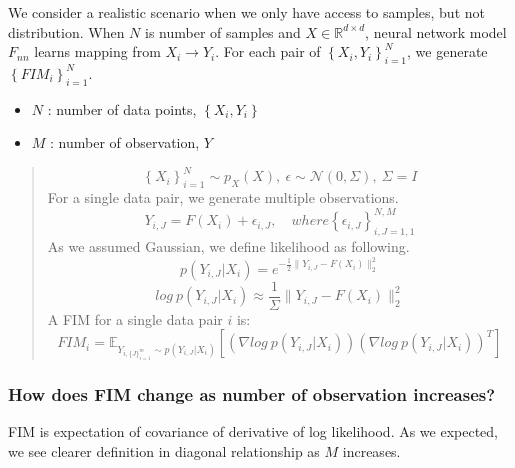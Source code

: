 \documentclass[
]{article}
\providecommand{\tightlist}{%
  \setlength{\itemsep}{0pt}\setlength{\parskip}{0pt}}\usepackage{longtable,booktabs,array}
\begin{document}
We consider a realistic scenario when we only have access to samples,
but not distribution. When \(N\) is number of samples and
\(X \in \mathbb{R}^{d \times d}\), neural network model \(F_{nn}\)
learns mapping from \(X_i \rightarrow Y_i\). For each pair of
\(\left\{X_i, Y_i \right\}^N_{i=1}\), we generate
\(\left\{FIM_i\right\}_{i=1}^{N}\).

\begin{itemize}
\tightlist
\item
  \(N\) : number of data points, \(\left\{X_i, Y_i \right\}\)
\item
  \(M\) : number of observation, \(Y\)
\end{itemize}

\begin{quote}
\[ \left\{ X_i \right\}^N_{i=1} \sim p_X(X), \: \epsilon \sim \mathcal{N}(0, \Sigma), \: \Sigma = I
\] For a single data pair, we generate multiple observations.
\[Y_{i, J} = F(X_i) + \epsilon_{i, J}, \quad where \left\{ \epsilon_{i,J}\right\}^{N,M}_{i,J= 1,1}\]
As we assumed Gaussian, we define likelihood as following.
\[p(Y_{i,J}|X_i) = e^{-\frac{1}{2}\|Y_{i,J}-F(X_i)\|^2_2}\]
\[log \: p(Y_{i,J}|X_i) \approx \frac{1}{\Sigma}\|Y_{i,J}-F(X_i)\|^2_2\]
A FIM for a single data pair \(i\) is:
\[FIM_i = \mathbb{E}_{Y_{i, \{J\}^m_{i=1}} \sim p(Y_{i,J}|X_i)} \left[ \left(\nabla log \: p(Y_{i,J}|X_i)\right)\left(\nabla log \: p(Y_{i,J}|X_i)\right)^T\right]\]
\end{quote}

\subsubsection{How does FIM change as number of observation
increases?}\label{how-does-fim-change-as-number-of-observation-increases}

FIM is expectation of covariance of derivative of log likelihood. As we
expected, we see clearer definition in diagonal relationship as \(M\)
increases.
\end{document}
